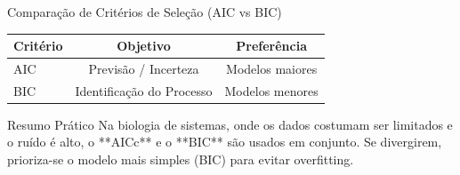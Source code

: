 \begin{frame}{Comparação de Critérios de Seleção (AIC vs BIC)}
\begin{center}
\begin{tabular}{lcc}
\toprule
\textbf{Critério} & \textbf{Objetivo} & \textbf{Preferência} \\
\midrule
AIC & Previsão / Incerteza & Modelos maiores \\
BIC & Identificação do Processo & Modelos menores \\
\bottomrule
\end{tabular}
\end{center}

\vspace{0.5cm}

\begin{exampleblock}{Resumo Prático}
Na biologia de sistemas, onde os dados costumam ser limitados e o ruído é alto, o **AICc** e o **BIC** são usados em conjunto. Se divergirem, prioriza-se o modelo mais simples (BIC) para evitar overfitting.
\end{exampleblock}
\end{frame}

